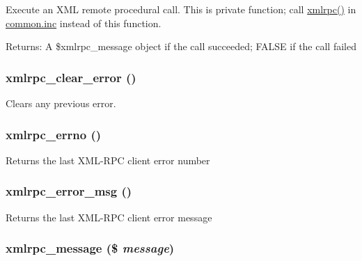 Execute an XML remote procedural call. This is private function; call \hyperlink{common_8inc_2bbed4b1646f9ddc309a752e451a86b2}{xmlrpc()} in \hyperlink{common_8inc}{common.inc} instead of this function.

\begin{Desc}
\item[Returns:]A \$xmlrpc\_\-message object if the call succeeded; FALSE if the call failed \end{Desc}
\hypertarget{xmlrpc_8inc_fa5cac64bc9057f6ac904b870d9c1311}{
\subsubsection[{xmlrpc\_\-clear\_\-error}]{\setlength{\rightskip}{0pt plus 5cm}xmlrpc\_\-clear\_\-error ()}}
\label{xmlrpc_8inc_fa5cac64bc9057f6ac904b870d9c1311}


Clears any previous error. \hypertarget{xmlrpc_8inc_f9d29505279c00e66545f3859550ff88}{
\subsubsection[{xmlrpc\_\-errno}]{\setlength{\rightskip}{0pt plus 5cm}xmlrpc\_\-errno ()}}
\label{xmlrpc_8inc_f9d29505279c00e66545f3859550ff88}


Returns the last XML-RPC client error number \hypertarget{xmlrpc_8inc_baf990108687e6e764164984306dbd55}{
\subsubsection[{xmlrpc\_\-error\_\-msg}]{\setlength{\rightskip}{0pt plus 5cm}xmlrpc\_\-error\_\-msg ()}}
\label{xmlrpc_8inc_baf990108687e6e764164984306dbd55}


Returns the last XML-RPC client error message \hypertarget{xmlrpc_8inc_623f37020bfae3dec50facefc4cdcdac}{
\subsubsection[{xmlrpc\_\-message}]{\setlength{\rightskip}{0pt plus 5cm}xmlrpc\_\-message (\$ {\em message})}}
\label{xmlrpc_8inc_623f37020bfae3dec50facefc4cdcdac}


